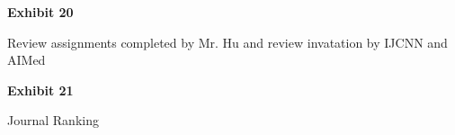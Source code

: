 \documentclass{article}
\begin{document}







\vspace*{\fill}
\begin{center}
{\LARGE \bf
Exhibit 20
}

\vspace{10\baselineskip}

{\large Review assignments completed by Mr. Hu and review invatation by IJCNN and AIMed}

\end{center}
\vspace*{\fill}

% 

\vspace*{\fill}
\begin{center}
{\LARGE \bf
Exhibit 21
}

\vspace{10\baselineskip}

{\large Journal Ranking}

\end{center}
\vspace*{\fill}

%
\end{document}
